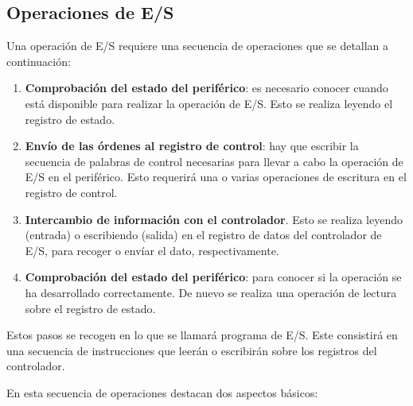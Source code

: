 \subsection{Operaciones de E/S}
Una operación de E/S requiere una secuencia de operaciones que se detallan a continuación:

\begin{enumerate}
	\item {\bf Comprobación del estado del periférico}: es necesario  conocer cuando está disponible para realizar la operación de E/S. Esto se realiza leyendo el registro de estado. 
	\item {\bf Envío de las órdenes al  registro de control}: hay que escribir la secuencia de palabras  de control necesarias para llevar a cabo la operación de E/S en el periférico. Esto requerirá una o varias operaciones de escritura en el registro de control. 
	\item {\bf Intercambio de información con el controlador}. Esto se realiza leyendo (entrada) o escribiendo (salida) en el registro de datos del controlador de E/S, para recoger o env\'iar el dato, respectivamente.
	\item {\bf Comprobación del estado del periférico}:  para conocer si la operación se ha desarrollado correctamente. De nuevo se realiza una operación de lectura sobre el registro de estado. 
\end{enumerate}

Estos pasos se recogen en lo que se llamará programa de E/S. Este consistirá en una secuencia de instrucciones que leerán o escribirán sobre los registros del controlador.

En esta secuencia de operaciones destacan dos  aspectos básicos:

